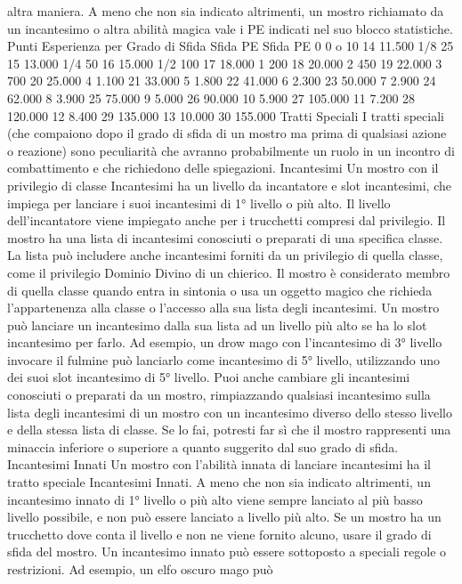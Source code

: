 \begin{multicols}{2}
altra maniera.
A meno che non sia indicato altrimenti, un mostro
richiamato da un incantesimo o altra abilità magica vale
i PE indicati nel suo blocco statistiche.
Punti Esperienza per Grado di Sfida
Sfida PE Sfida PE
0 0 o 10 14 11.500
1/8 25 15 13.000
1/4 50 16 15.000
1/2 100 17 18.000
1 200 18 20.000
2 450 19 22.000
3 700 20 25.000
4 1.100 21 33.000
5 1.800 22 41.000
6 2.300 23 50.000
7 2.900 24 62.000
8 3.900 25 75.000
9 5.000 26 90.000
10 5.900 27 105.000
11 7.200 28 120.000
12 8.400 29 135.000
13 10.000 30 155.000
Tratti Speciali
I tratti speciali (che compaiono dopo il grado di sfida di un
mostro ma prima di qualsiasi azione o reazione) sono
peculiarità che avranno probabilmente un ruolo in un
incontro di combattimento e che richiedono delle
spiegazioni.
Incantesimi
Un mostro con il privilegio di classe Incantesimi ha un
livello da incantatore e slot incantesimi, che impiega per
lanciare i suoi incantesimi di 1° livello o più alto. Il livello
dell’incantatore viene impiegato anche per i trucchetti
compresi dal privilegio.
Il mostro ha una lista di incantesimi conosciuti o preparati di
una specifica classe. La lista può includere anche incantesimi
forniti da un privilegio di quella classe, come il privilegio
Dominio Divino di un chierico. Il mostro è considerato
membro di quella classe quando entra in sintonia o usa un
oggetto magico che richieda l’appartenenza alla classe o
l’accesso alla sua lista degli incantesimi.
Un mostro può lanciare un incantesimo dalla sua lista ad un
livello più alto se ha lo slot incantesimo per farlo. Ad
esempio, un drow mago con l’incantesimo di 3° livello
invocare il fulmine può lanciarlo come incantesimo di 5°
livello, utilizzando uno dei suoi slot incantesimo di 5° livello.
Puoi anche cambiare gli incantesimi conosciuti o
preparati da un mostro, rimpiazzando qualsiasi
incantesimo sulla lista degli incantesimi di un mostro
con un incantesimo diverso dello stesso livello e della
stessa lista di classe. Se lo fai, potresti far sì che il
mostro rappresenti una minaccia inferiore o superiore a
quanto suggerito dal suo grado di sfida.
Incantesimi Innati
Un mostro con l’abilità innata di lanciare incantesimi ha il
tratto speciale Incantesimi Innati. A meno che non sia
indicato altrimenti, un incantesimo innato di 1° livello o più
alto viene sempre lanciato al più basso livello possibile, e
non può essere lanciato a livello più alto. Se un mostro ha
un trucchetto dove conta il livello e non ne viene fornito
alcuno, usare il grado di sfida del mostro.
Un incantesimo innato può essere sottoposto a speciali
regole o restrizioni. Ad esempio, un elfo oscuro mago può

\end{multicols}
